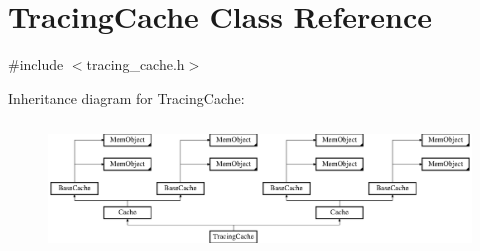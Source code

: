 \hypertarget{classTracingCache}{\section{Tracing\-Cache Class Reference}
\label{classTracingCache}
}


{\ttfamily \#include $<$tracing\-\_\-cache.\-h$>$}

Inheritance diagram for Tracing\-Cache\-:\begin{figure}[H]
\begin{center}
\leavevmode
\includegraphics[height=3.500000cm]{classTracingCache}
\end{center}
\end{figure}
